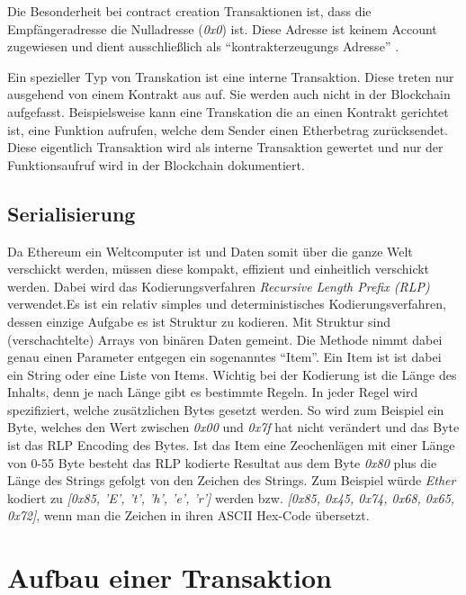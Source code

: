 \documentclass[runningheads]{llncs}
\begin{document}
Die Besonderheit bei contract creation Transaktionen ist, dass die Empfängeradresse die Nulladresse (\textit{0x0}) ist. Diese Adresse ist keinem Account zugewiesen und dient ausschließlich als "`kontrakterzeugungs Adresse"' \cite{antonopoulos_mastering_2019}.

Ein spezieller Typ von Transkation ist eine interne Transaktion. Diese treten nur ausgehend von einem Kontrakt aus auf. Sie werden auch nicht in der Blockchain aufgefasst. Beispielsweise kann eine Transkation die an einen Kontrakt gerichtet ist, eine Funktion aufrufen, welche dem Sender einen Etherbetrag zurücksendet. Diese eigentlich Transaktion wird als interne Transaktion gewertet und nur der Funktionsaufruf wird in der Blockchain dokumentiert.

\subsection{Serialisierung}
Da Ethereum ein Weltcomputer ist und Daten somit über die ganze Welt verschickt werden, müssen diese kompakt, effizient und einheitlich verschickt werden. Dabei wird das Kodierungsverfahren \textit{Recursive Length Prefix (RLP)} verwendet.Es ist ein relativ simples und deterministisches Kodierungsverfahren, dessen einzige Aufgabe es ist Struktur zu kodieren. Mit Struktur sind (verschachtelte) Arrays von binären Daten gemeint. Die Methode nimmt dabei genau einen Parameter entgegen ein sogenanntes "`Item"'. %
Ein Item ist ist dabei ein String oder eine Liste von Items. Wichtig bei der Kodierung ist die Länge des Inhalts, denn je nach Länge gibt es bestimmte Regeln. In jeder Regel wird spezifiziert, welche zusätzlichen Bytes gesetzt werden. So wird zum Beispiel ein Byte, welches den Wert zwischen \textit{0x00} und \textit{0x7f} hat nicht verändert und das Byte ist das RLP Encoding des Bytes. Ist das Item eine Zeochenlägen mit einer Länge von 0-55 Byte besteht das RLP kodierte Resultat aus dem Byte \textit{0x80} plus die Länge des Strings gefolgt von den Zeichen des Strings. Zum Beispiel würde \textit{Ether} kodiert zu \textit{[0x85, 'E', 't', 'h', 'e', 'r']} werden bzw.  \textit{[0x85, 0x45, 0x74, 0x68, 0x65, 0x72]}, wenn man die Zeichen in ihren ASCII Hex-Code übersetzt.

\section{Aufbau einer Transaktion}
\end{document}
